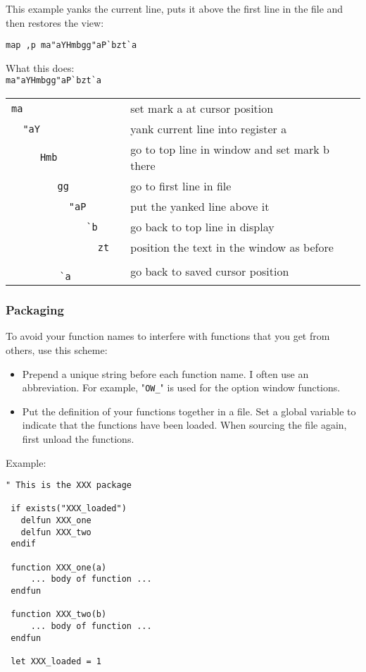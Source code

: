 This example yanks the current line, puts it above the first line in the file and then restores the view:

\begin{Verbatim}[samepage=true]
 map ,p ma"aYHmbgg"aP`bzt`a
\end{Verbatim}

What this does:\\
\verb!ma"aYHmbgg"aP`bzt`a!
\begin{center} \begin{tabular}{c l}
\verb!ma                 ! & set mark a at cursor position \\
\verb!  "aY              ! & yank current line into register a \\
\verb!     Hmb           ! & go to top line in window and set mark b there \\
\verb!        gg         ! & go to first line in file \\
\verb!          "aP      ! & put the yanked line above it \\
\verb!             `b    ! & go back to top line in display \\
\verb!               zt  ! & position the text in the window as before \\
\verb!                 `a! & go back to saved cursor position \\
\end{tabular} \end{center}

\subsubsection{Packaging}
To avoid your function names to interfere with functions that you get from others, use this scheme:
\begin{itemize} 
				\item Prepend a unique string before each function name.
								I often use an abbreviation.
								For example, "\verb!OW_!" is used for the option window functions.
				\item Put the definition of your functions together in a file.
								Set a global variable to indicate that the functions have been loaded.
								When sourcing the file again, first unload the functions.
\end{itemize}

Example:

\begin{Verbatim}[samepage=true]
 " This is the XXX package

 if exists("XXX_loaded")
   delfun XXX_one
   delfun XXX_two
 endif

 function XXX_one(a)
     ... body of function ...
 endfun

 function XXX_two(b)
     ... body of function ...
 endfun

 let XXX_loaded = 1
\end{Verbatim}
